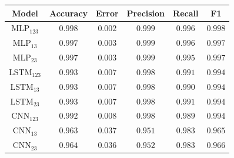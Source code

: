 \documentclass[a4paper,fleqn]{cas-sc}
\begin{document}
\hfill
\begin{minipage}{0.45\textwidth}
	\begingroup
	\begin{tiny}	
		\setlength{\tabcolsep}{3pt}
		\renewcommand{\arraystretch}{1.15}
		
		
		\begin{tabular*}{\textwidth}{@{} CCCCCC@{} }
			\toprule
			Model&Accuracy&Error&Precision&Recall&F1 \\
			\midrule
				MLP$_{123}$ & $0.998$ & $0.002$ & $0.999$ & $0.996$ & $0.998$ \\
				MLP$_{13}$ & $0.997$ & $0.003$ & $0.999$ & $0.996$ & $0.997$ \\
				MLP$_{23}$ & $0.997$ & $0.003$ & $0.999$ & $0.995$ & $0.997$ \\
				LSTM$_{123}$ & $0.993$ & $0.007$ & $0.998$ & $0.991$ & $0.994$ \\
				LSTM$_{13}$ & $0.993$ & $0.007$ & $0.998$ & $0.990$ & $0.994$ \\
				LSTM$_{23}$ & $0.993$ & $0.007$ & $0.998$ & $0.991$ & $0.994$ \\
				CNN$_{123}$ & $0.992$ & $0.008$ & $0.998$ & $0.989$ & $0.994$ \\
				CNN$_{13}$ & $0.963$ & $0.037$ & $0.951$ & $0.983$ & $0.965$ \\
				CNN$_{23}$ & $0.964$ & $0.036$ & $0.952$ & $0.983$ & $0.966$ \\
			\bottomrule
		\end{tabular*}
		\vspace{-0.3cm}
		\label{tab:metricas_generalizacao_10Mbps_teste}
	\end{tiny}
	\endgroup
\end{minipage}
\hfill
\end{document}

